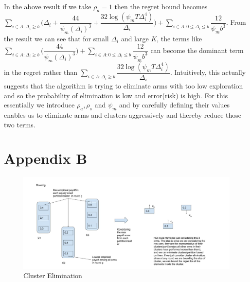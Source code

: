 \begin{remark}
\label{App:A:Rem:1}
In the above result if we take $\rho_{a}=1$ then the regret bound becomes $ \sum\limits_{i\in A:\Delta_{i}\geq b}\bigg(\Delta_{i} + \dfrac{44}{\psi_{m}(\Delta_{i})^{3}} + \dfrac{32\log{(\psi_{m}T\Delta_{i}^{4})}}{\Delta_{i}}\bigg) + \sum\limits_{i\in A:0\leq\Delta_{i}\leq b}\dfrac{12}{\psi_{m}b^{3}}$. From the result we can see that for small $\Delta_{i}$ and large $K$, the terms like $ \sum_{i\in A:\Delta_{i}\geq b}\bigg(\dfrac{44}{\psi_{m}(\Delta_{i})^{3}}\bigg) + \sum_{i\in A:0\leq\Delta_{i}\leq b}\dfrac{12}{\psi_{m}b^{3}}$ can become the dominant term in the regret rather than $\sum_{i\in A:\Delta_{i}\geq b}\dfrac{32\log{(\psi_{m}T\Delta_{i}^{4})}}{\Delta_{i}}$. Intuitively, this actually suggests that the algorithm is trying to eliminate arms with too low exploration and so the probability of elimination is low and error(risk) is high. For this essentially we introduce $\rho_{a},\rho_{s}$ and $\psi_{m}$ and by carefully defining their values enables us to eliminate arms and clusters aggressively and thereby reduce those two terms. 
\end{remark}

\section{Appendix B}
\label{App:B}
\begin{figure}
\includegraphics[scale=0.3]{img/diagCluster.jpg}
\caption{Cluster Elimination}
\label{Fig:ClusFig}
\end{figure}

